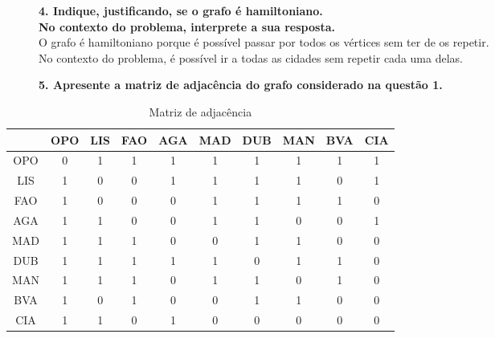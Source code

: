 \documentclass[a4wide]{report}
\begin{document}
\begin{description} 
\item[]\textbf{4. Indique, justificando, se o grafo é hamiltoniano.\\
No contexto do problema, interprete a sua resposta.
}\\
O grafo é hamiltoniano porque é possível passar por todos os vértices sem ter de os repetir.\\
No contexto do problema, é possível ir a todas as cidades sem repetir cada uma delas.\\
\end{description}

\begin{description} 
\item[]\textbf{5. Apresente a matriz de adjacência do grafo considerado na questão 1.\\
}
\end{description}
\begin{table}[h]
    \centering
    \begin{tabular}{|c|c|c|c|c|c|c|c|c|c|}
        \hline
        \ & OPO & LIS & FAO & AGA & MAD & DUB & MAN & BVA & CIA \\
        \hline
        OPO & 0 & 1 & 1 & 1 & 1 & 1 & 1 & 1 & 1 \\
        \hline
        LIS & 1 & 0 & 0 & 1 & 1 & 1 & 1 & 0 & 1 \\
        \hline
        FAO & 1 &0 &0& 0& 1& 1& 1 &1& 0 \\
        \hline
        AGA & 1& 1 &0 &0 &1& 1& 0& 0& 1 \\
        \hline
        MAD &1& 1& 1& 0& 0 &1& 1& 0& 0 \\
        \hline
        DUB& 1 &1& 1 &1 &1& 0& 1& 1 &0 \\
        \hline
        MAN& 1& 1& 1 &0& 1& 1 &0 &1 &0 \\
        \hline
        BVA& 1& 0& 1& 0& 0& 1 &1& 0& 0 \\
        \hline
        CIA& 1 &1& 0& 1& 0& 0& 0& 0& 0 \\
        \hline
    \end{tabular}
    \caption{Matriz de adjacência}
\end{table}
\end{document}
